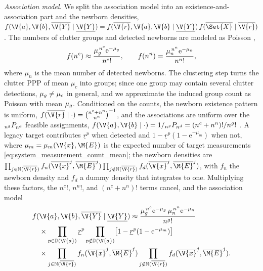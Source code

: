 \emph{Association model.} We split the association model into an existence-and-association part and the newborn densities, \(f(\V{a},\V{b},\overline{\V{Y}}\mid\underline{\V{Y}})=f(\overline{\V{r}},\V{a},\V{b}\mid\underline{\V{Y}})\,f(\overline{\Set{X}}\mid\overline{\V{r}})\). The numbers of clutter groups and detected newborns are modeled as Poisson \cite[Eqs.~(3),(18)]{meyer2018messagepassingSupplement},
\begin{equation}
f(n^c)\approx\frac{\mu_{g}^{\,n^c}\mathrm e^{-\mu_{g}}}{n^c!},
\qquad
f(n^n)=\frac{\mu_n^{\,n^n}\mathrm e^{-\mu_n}}{n^n!},
\label{eq:pt_counts_distributions}
\end{equation}
where \(\mu_n\) is the mean number of detected newborns. The clustering step turns the clutter \ac{PPP} of mean \(\mu_c\) into groups; since one group may contain several clutter detections, \(\mu_{g}\neq\mu_c\) in general, and we approximate the induced group count as Poisson with mean \(\mu_{g}\). Conditioned on the counts, the newborn existence pattern is uniform, \(f(\overline{\V{r}}\mid\cdot)=\binom{n^c+n^n}{n^n}^{-1}\), and the associations are uniform over the \({}_{n^g}P_{n^d}\) feasible assignments, \(f(\V{a},\V{b}\mid\cdot)=1/\Pm{n^g}{n^d}=(n^c+n^n)!/n^g!\) \cite[Eqs.~(22)--(24)]{meyer2018messagepassingSupplement}. A legacy target contributes \(\underline{r}^p\) when detected and \(1-\underline{r}^p(1-\mathrm e^{-\mu_m})\) when not, where \(\mu_m=\mu_m(\V{x},\M{E})\) is the expected number of target measurements \eqref{eq:system_measurement_count_mean}; the newborn densities are \(\prod_{j\in\mathbb{N}(\overline{\V{r}})}f_n(\overline{\V{x}}^j,\overline{\M{E}}^j)\prod_{j\notin\mathbb{N}(\overline{\V{r}})}f_d(\overline{\V{x}}^j,\overline{\M{E}}^j)\), with \(f_n\) the newborn density and \(f_d\) a dummy density that integrates to one. Multiplying these factors, the \(n^c!\), \(n^n!\), and \((n^c+n^n)!\) terms cancel, and the association model %
\begin{equation}
\begin{aligned}
&f(\V{a},\V{b},\overline{\V{Y}}\mid\underline{\V{Y}})
\approx \frac{\mucgroup^{\,n^c}\mathrm e^{-\mucgroup}\,\mu_n^{\,n^n}\mathrm e^{-\mu_n}}{n^g!}
\\
&\quad\times
\prod_{p\in\mathbb{D}(\V{a})}\underline{r}^{p}
\prod_{p\notin\mathbb{D}(\V{a})}\bigl[1-\underline{r}^{p}(1-\mathrm e^{-\mu_m})\bigr]
\\
&\quad\times
\prod_{j\in\mathbb{N}(\overline{\V{r}})}f_n(\overline{\V{x}}^{j},\overline{\M{E}}^{j})
\prod_{j\notin\mathbb{N}(\overline{\V{r}})}f_d(\overline{\V{x}}^{j},\overline{\M{E}}^{j}).
\end{aligned}
\label{eq:I13}
\end{equation}

